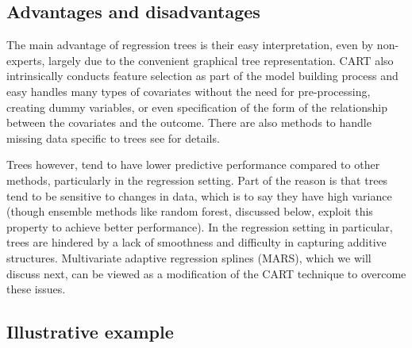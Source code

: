 \documentclass[12pt]{article}
\begin{document}

%
%


\subsection{Advantages and disadvantages} %
\label{sub:advantages_and_disadvantages_to_cart}

The main advantage of regression trees is their easy interpretation, even by non-experts, largely due to the convenient graphical tree representation. CART also intrinsically conducts feature selection as part of the model building process and easy handles many types of covariates without the need for pre-processing, creating dummy variables, or even specification of the form of the relationship between the covariates and the outcome. There are also methods to handle missing data specific to trees see \textcite{esl} for details.

Trees however, tend to have lower predictive performance compared to other methods, particularly in the regression setting. Part of the reason is that trees tend to be sensitive to changes in data, which is to say they have high variance (though ensemble methods like random forest, discussed below, exploit this property to achieve better performance). In the regression setting in particular, trees are hindered by a lack of smoothness and difficulty in capturing additive structures. Multivariate adaptive regression splines (MARS), which we will discuss next, can be viewed as a modification of the CART technique to overcome these issues.


\subsection{Illustrative example} %
\label{sub:cart-ex}
\end{document}
